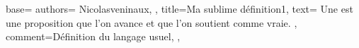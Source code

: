 {
  base={
    authors={
      Nicolasveninaux,
    },
    title=Ma sublime définition1,
    text={%
      Une  est une proposition que l'on avance et que l'on soutient comme vraie.%
    },
    comment={Définition du langage usuel},
  },
}
